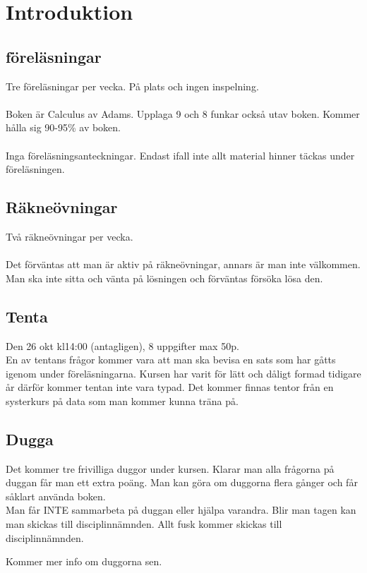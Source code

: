 \chapter*{Introduktion}
\section*{föreläsningar}
Tre föreläsningar per vecka. På plats och ingen inspelning.\\
\\
Boken är Calculus av Adams. Upplaga 9 och 8 funkar också utav boken.
Kommer hålla sig 90-95\% av boken.\\
\\
Inga föreläsningsanteckningar.
Endast ifall inte allt material hinner täckas under föreläsningen.

\section*{Räkneövningar}
Två räkneövningar per vecka.\\
\\
Det förväntas att man är aktiv på räkneövningar, annars är man inte välkommen.
Man ska inte sitta och vänta på lösningen och förväntas försöka lösa den.

\section*{Tenta}
Den 26 okt kl14:00 (antagligen), 8 uppgifter max 50p.\\
En av tentans frågor kommer vara att man ska bevisa en sats som har gåtts
igenom under föreläsningarna.
Kursen har varit för lätt och dåligt formad tidigare år därför kommer
tentan inte vara typad.
Det kommer finnas tentor från en systerkurs på data som man kommer kunna träna på.

\section*{Dugga}
Det kommer tre frivilliga duggor under kursen.
Klarar man alla frågorna på duggan får man ett extra poäng.
Man kan göra om duggorna flera gånger och får såklart använda boken.\\
Man får INTE sammarbeta på duggan eller hjälpa varandra.
Blir man tagen kan man skickas till disciplinnämnden.
Allt fusk kommer skickas till disciplinnämnden.

Kommer mer info om duggorna sen.\\